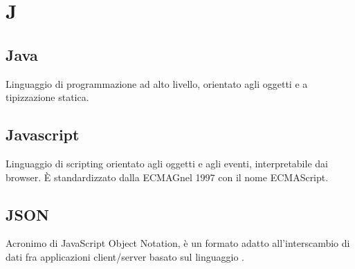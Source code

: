 \section*{J}
\markright{}
\subsection*{Java}
Linguaggio di programmazione ad alto livello, orientato agli oggetti e a tipizzazione statica.

\subsection*{Javascript}
Linguaggio di scripting orientato agli oggetti e agli eventi, interpretabile dai browser. È standardizzato dalla ECMAGnel 1997 con il nome ECMAScript.

\subsection*{JSON}
Acronimo di JavaScript Object Notation, è un formato adatto all'interscambio di dati fra applicazioni client/server basato sul linguaggio .